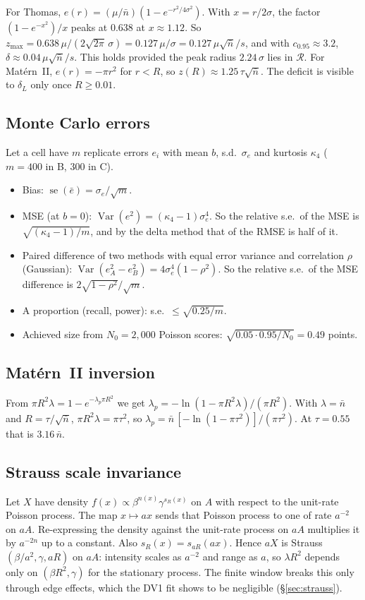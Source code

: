 \documentclass[10pt,a4paper]{article}
\newcommand{\nbar}{\bar n}
\newcommand{\R}{\mathcal{R}}
\begin{document}
For Thomas, $e(r)=(\mu/\nbar)(1-e^{-r^2/4\sigma^2})$. With $x=r/2\sigma$, the factor $(1-e^{-x^2})/x$ peaks at $0.638$ at $x\approx1.12$. So $z_{\max}=0.638\,\mu/(2\sqrt{2\pi}\,\sigma)=0.127\,\mu/\sigma=0.127\,\mu\sqrt{\nbar}/s$, and with $c_{0.95}\approx3.2$, $\delta\approx0.04\,\mu\sqrt{\nbar}/s$. This holds provided the peak radius $2.24\,\sigma$ lies in $\R$. For Mat\'ern~II, $e(r)=-\pi r^2$ for $r<R$, so $z(R)\approx1.25\,\tau\sqrt{\nbar}$. The deficit is visible to $\delta_L$ only once $R\ge0.01$.

\subsection{Monte Carlo errors}\label{app:mc}
Let a cell have $m$ replicate errors $e_i$ with mean $b$, s.d.\ $\sigma_e$ and kurtosis $\kappa_4$ ($m=400$ in B, 300 in C).
\begin{itemize}
  \item Bias: $\operatorname{se}(\bar e)=\sigma_e/\sqrt{m}$.
  \item MSE (at $b=0$): $\operatorname{Var}(e^2)=(\kappa_4-1)\sigma_e^4$. So the relative s.e.\ of the MSE is $\sqrt{(\kappa_4-1)/m}$, and by the delta method that of the RMSE is half of it.
  \item Paired difference of two methods with equal error variance and correlation $\rho$ (Gaussian): $\operatorname{Var}(e_A^2-e_B^2)=4\sigma_e^4(1-\rho^2)$. So the relative s.e.\ of the MSE difference is $2\sqrt{1-\rho^2}/\sqrt{m}$.
  \item A proportion (recall, power): s.e.\ $\le\sqrt{0.25/m}$.
  \item Achieved size from $N_0=2{,}000$ Poisson scores: $\sqrt{0.05\cdot0.95/N_0}=0.49$ points.
\end{itemize}

\subsection{Mat\'ern~II inversion}\label{app:m2}
From $\pi R^2\lambda=1-e^{-\lambda_p\pi R^2}$ we get $\lambda_p=-\ln(1-\pi R^2\lambda)/(\pi R^2)$. With $\lambda=\nbar$ and $R=\tau/\sqrt{\nbar}$, $\pi R^2\lambda=\pi\tau^2$, so $\lambda_p=\nbar\,[-\ln(1-\pi\tau^2)]/(\pi\tau^2)$. At $\tau=0.55$ that is $3.16\,\nbar$.

\subsection{Strauss scale invariance}\label{app:scale}
Let $X$ have density $f(x)\propto\beta^{n(x)}\gamma^{s_R(x)}$ on $A$ with respect to the unit-rate Poisson process. The map $x\mapsto ax$ sends that Poisson process to one of rate $a^{-2}$ on $aA$. Re-expressing the density against the unit-rate process on $aA$ multiplies it by $a^{-2n}$ up to a constant. Also $s_R(x)=s_{aR}(ax)$. Hence $aX$ is Strauss$(\beta/a^2,\gamma,aR)$ on $aA$: intensity scales as $a^{-2}$ and range as $a$, so $\lambda R^2$ depends only on $(\beta R^2,\gamma)$ for the stationary process. The finite window breaks this only through edge effects, which the DV1 fit shows to be negligible (\S\ref{sec:strauss}).
\end{document}
